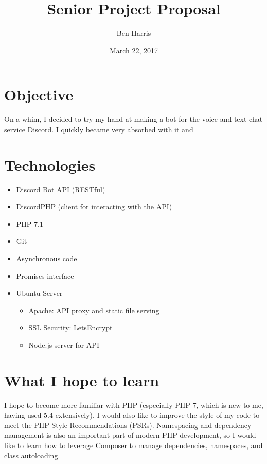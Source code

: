 \documentclass[11pt]{article}
\title{Senior Project Proposal}
\date{March 22, 2017}
\author{Ben Harris}
\begin{document}
    \maketitle

    \section{Objective}

        On a whim, I decided to try my hand at making a bot for the voice and text chat service Discord. I quickly became very absorbed with it and

    \section{Technologies}

        \begin{itemize}
            \item Discord Bot API (RESTful)
            \item DiscordPHP (client for interacting with the API)
            \item PHP 7.1
            \item Git
            \item Asynchronous code
            \item Promises interface
            \item Ubuntu Server
                \begin{itemize}
                    \item Apache: API proxy and static file serving
                    \item SSL Security: LetsEncrypt
                    \item Node.js server for API
                \end{itemize}

        \end{itemize}

    \section{What I hope to learn}

        I hope to become more familiar with PHP (especially PHP 7, which is new to me, having used 5.4 extensively). I would also like to improve the style of my code to meet the PHP Style Recommendations (PSRs). Namespacing and dependency management is also an important part of modern PHP development, so I would like to learn how to leverage Composer to manage dependencies, namespaces, and class autoloading.
\end{document}
